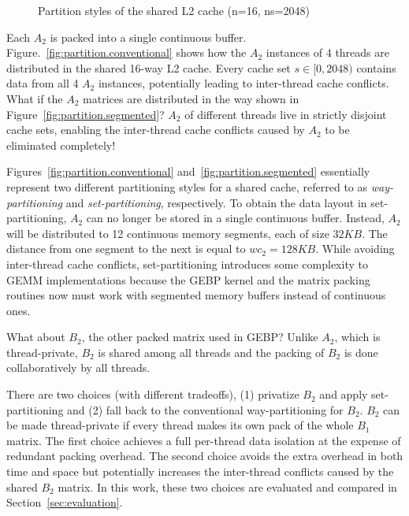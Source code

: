 \begin{figure}
  \centering
  \caption{Partition styles of the shared L2 cache (n=16, ns=2048)}
  \label{fig:partition}
\end{figure}

Each $A_2$ is packed into a single continuous buffer.
Figure.~\ref{fig:partition.conventional} shows how the
$A_2$ instances of 4 threads are distributed in the shared 16-way L2 cache.
Every cache set $s \in [0,2048)$ contains
data from all 4 $A_2$ instances,
potentially leading to inter-thread cache conflicts.
What if the $A_2$ matrices are distributed in the way shown in
Figure~\ref{fig:partition.segmented}?
$A_2$ of different threads live in strictly disjoint cache sets, enabling
the inter-thread cache conflicts caused by $A_2$ to be
eliminated completely!

Figures~\ref{fig:partition.conventional} and~\ref{fig:partition.segmented}
essentially represent two different partitioning styles for a shared cache,
referred to as \emph{way-partitioning} and \emph{set-partitioning}, respectively.
To obtain the data layout in set-partitioning,
$A_2$ can no longer be stored in a single continuous buffer.
Instead, $A_2$ will be distributed to 12 continuous memory segments, each of size $32KB$.
The distance from one segment to the next is equal to $wc_2=128KB$.
While avoiding inter-thread cache conflicts,
set-partitioning
introduces some complexity to GEMM implementations
because the GEBP kernel and the matrix packing routines
now must work with segmented memory buffers instead of continuous ones.

What about $B_2$, the other packed matrix used in GEBP?
Unlike $A_2$, which is thread-private,
$B_2$ is shared among all threads and
the packing of $B_2$ is done collaboratively by all threads.

There are two choices (with different tradeoffs), (1) privatize $B_2$ and apply 
set-partitioning and (2) 
fall back to the conventional way-partitioning for $B_2$.
$B_2$ can be made thread-private if every thread makes
its own pack of the whole $B_1$ matrix.
The first choice achieves a full per-thread data isolation
at the expense of redundant packing overhead.
The second choice avoids the extra overhead in both time and space
but potentially increases the inter-thread conflicts caused
by the shared $B_2$ matrix.
In this work, these two choices are evaluated
and compared in Section~\ref{sec:evaluation}.


